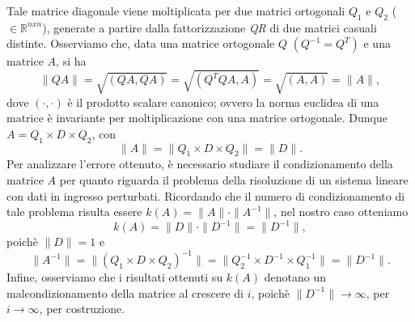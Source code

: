 Tale matrice diagonale viene moltiplicata per due matrici ortogonali $Q_\mathrm{1}$ e $Q_\mathrm{2}$ ($\in\mathbb{R}^{nxn}$), generate a partire dalla fattorizzazione \textit{QR} di due matrici casuali distinte. Osserviamo che, data una matrice ortogonale $Q$ $(Q^{-1} = Q^{T})$ e una matrice $A$, si ha $$\|QA\|=\sqrt{(QA,QA)}=\sqrt{(Q^TQA,A)}=\sqrt{(A,A)} = \|A\|,$$ dove $(\cdot,\cdot)$ è il prodotto scalare canonico; ovvero la norma euclidea di una matrice è invariante per moltiplicazione con una matrice ortogonale.
Dunque $A = Q_\mathrm{1} \times D \times Q_\mathrm{2}$, con $$\|A\| = \|Q_\mathrm{1} \times D \times Q_\mathrm{2}\|= \|D\|.$$
Per analizzare l'errore ottenuto, è necessario studiare il condizionamento della matrice $A$ per quanto riguarda il problema della risoluzione di un sistema lineare con dati in ingresso perturbati. Ricordando che il numero di condizionamento di tale problema risulta essere $k(A) = \|A\|\cdot\|A^{-1}\|$, nel nostro caso otteniamo $$k(A) = \|D\|\cdot\|D^{-1}\| =\|D^{-1}\|,$$ poichè $\|D\|=1$ e $$\|A^{-1}\|=\|(Q_\mathrm{1} \times D \times Q_\mathrm{2})^{-1}\|=\|Q_\mathrm{2}^{-1} \times D^{-1} \times Q_\mathrm{1}^{-1}\|=\|D^{-1}\|.$$
Infine, osserviamo che i risultati ottenuti su $k(A)$ denotano un malcondizionamento della matrice al crescere di $i$, poichè $\|D^{-1}\|\rightarrow \infty$, per $i \rightarrow \infty$, per costruzione.
